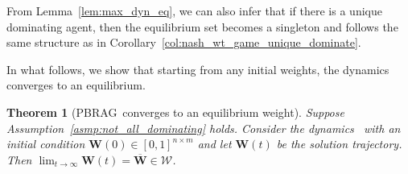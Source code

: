 \documentclass{IEEEtran}
\newcommand{\Mcal}[1]{\mathcal{#1}}
\newcommand{\Mc}[1]{\mathcal{#1}}
\newcommand{\bld}[1]{\mathbf{#1}}
\newcommand{\thmtitle}[1]{\mbox{}\emph{(#1).}}
\newtheorem{theorem}{Theorem}[section]
\renewcommand{\bar}[1]{\overline{#1}}
\newcommand{\marginn}[1]{\marginpar{\color{blue}\tiny\ttfamily#1}}
\newcommand{\margin}[1]{\marginpar{\color{magenta}\tiny\ttfamily#1}}
\def \agt{\Mcal{A}}
\def \eqpt{\Mcal{W}}
\def \kcell{[0,1]}
\def \tsk{\Mc{Q}}
\def \W{\bld{W}}
\def \Wb{\bar{\W}}
\def \dynacr{PBRAG}
\begin{document}
From Lemma~\ref{lem:max_dyn_eq}, we can also infer that if there is a
unique dominating agent, then the equilibrium set becomes a singleton
and follows the same structure as in
Corollary~\ref{col:nash_wt_game_unique_dominate}.

In what follows, we show that starting from any initial weights, the
dynamics~ converges to an equilibrium.

\begin{theorem}[\dynacr\, converges to an equilibrium weight]\label{th:wt_converge}
Suppose Assumption~\ref{asmp:not_all_dominating} holds.
  Consider the dynamics~ with an initial
  condition $\W(0) \in \kcell^{n \times m}$ and let $\W(t)$ be the 
  solution trajectory. Then $\lim_{t \to \infty} \W(t) = \Wb \in \eqpt$. %
\end{theorem}
\end{document}
